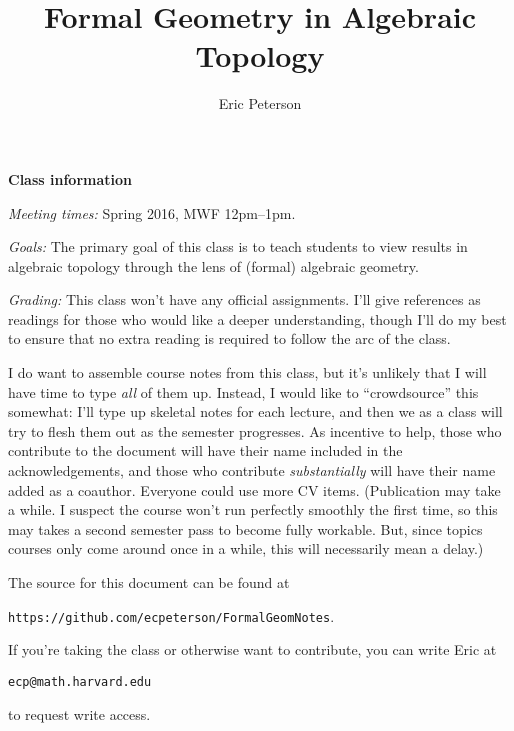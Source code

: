 \documentclass[12pt]{book}
\title{Formal Geometry in Algebraic Topology}
\author{Eric Peterson}
\newcommand{\<}{\langle}
\renewcommand{\>}{\rangle}
\numberwithin{equation}{section}
\theoremstyle{plain}
\theoremstyle{definition}
\theoremstyle{remark}
\begin{document}
\maketitle

\textbf{Class information}

\vspace{2\baselineskip} \noindent \textit{Meeting times: }
Spring 2016, MWF 12pm--1pm.

\vspace{2\baselineskip} \noindent \textit{Goals: }
The primary goal of this class is to teach students to view results in algebraic topology through the lens of (formal) algebraic geometry.

\vspace{2\baselineskip} \noindent \textit{Grading: }
This class won't have any official assignments. I'll give references as readings for those who would like a deeper understanding, though I'll do my best to ensure that no extra reading is required to follow the arc of the class.

I do want to assemble course notes from this class, but it's unlikely that I will have time to type \emph{all} of them up. Instead, I would like to ``crowdsource'' this somewhat: I'll type up skeletal notes for each lecture, and then we as a class will try to flesh them out as the semester progresses. As incentive to help, those who contribute to the document will have their name included in the acknowledgements, and those who contribute \emph{substantially} will have their name added as a coauthor. Everyone could use more CV items. (Publication may take a while. I suspect the course won't run perfectly smoothly the first time, so this may takes a second semester pass to become fully workable. But, since topics courses only come around once in a while, this will necessarily mean a delay.)

The source for this document can be found at
\begin{center}
\texttt{https://github.com/ecpeterson/FormalGeomNotes}.
\end{center}
If you're taking the class or otherwise want to contribute, you can write Eric at
\begin{center}
\texttt{ecp@math.harvard.edu}
\end{center}
to request write access.



\newpage

\tableofcontents


\end{document}
